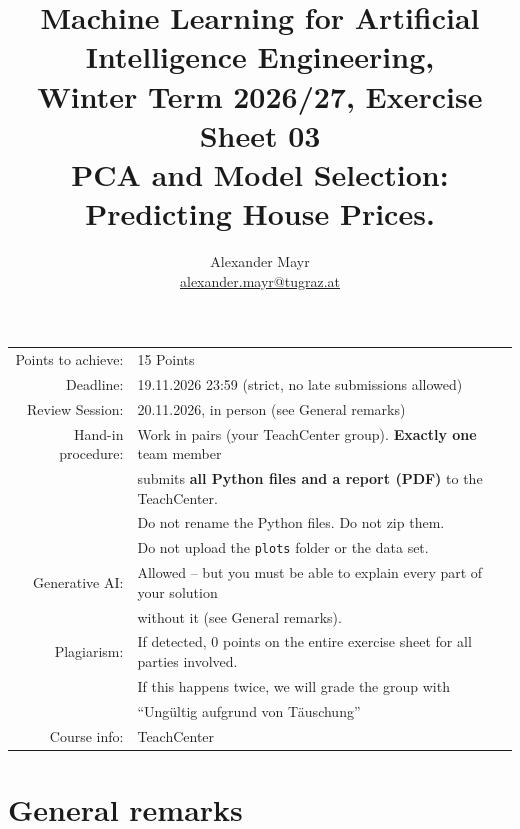 \documentclass[hidelinks,10pt]{article}
\begin{document}
\title{Machine Learning for Artificial Intelligence Engineering,\\
Winter Term 2026/27, Exercise Sheet 03\\
PCA and Model Selection: Predicting House Prices.}
\author{
    Alexander Mayr \\ \href{mailto:alexander.mayr@tugraz.at}{alexander.mayr@tugraz.at}
}
\date{}

\maketitle
\begin{tabular}{rl}
    Points to achieve: & 15 Points\\
    Deadline: & 19.11.2026 23:59 (strict, no late submissions allowed)\\
    Review Session: & 20.11.2026, in person (see General remarks)\\
    Hand-in procedure: & Work in pairs (your TeachCenter group). \textbf{Exactly one} team member\\
    & submits \textbf{all Python files and a report (PDF)} to the TeachCenter.\\
    & Do not rename the Python files. Do not zip them.\\
    & Do not upload the \texttt{plots} folder or the data set.\\
    Generative AI: & Allowed -- but you must be able to explain every part of your solution\\
    & without it (see General remarks).\\
    Plagiarism: & If detected, 0 points on the entire exercise sheet for all parties involved.\\
    & If this happens twice, we will grade the group with\\
    & ``Ungültig aufgrund von Täuschung''\\
    Course info: & TeachCenter\\
\end{tabular}

\vspace*{0.5cm}

\tableofcontents

\pagebreak

\begingroup
\section*{General remarks}
\end{document}

